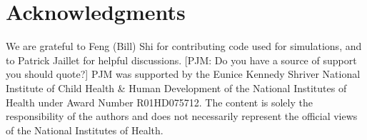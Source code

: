 \documentclass[review, onefignum, onetabnum]{siamart171218}
\newcommand{\pjm}[1]{{\color{blue}[PJM: #1]}}
\begin{document}
	
\section*{Acknowledgments} 
	We are grateful to Feng (Bill) Shi for contributing code used for simulations, and to Patrick Jaillet for helpful discussions. \pjm{Do you have a source of support you should quote?} PJM was supported by the Eunice Kennedy Shriver National Institute of Child Health \& Human Development of the National Institutes of Health under Award Number R01HD075712. The content is solely the responsibility of the authors and does not necessarily represent the official views of the National Institutes of Health.


{}
\end{document}
